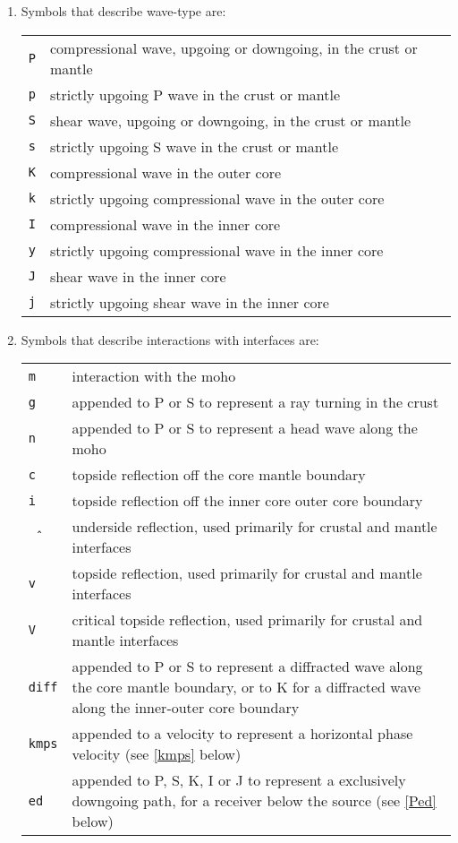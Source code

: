 \begin{enumerate}
\item Symbols that describe wave-type are:

\begin{tabular}{lp{5.0in}}
\texttt{P} & compressional wave, upgoing or downgoing, in the crust or mantle \\
\texttt{p} & strictly upgoing P wave in the crust or mantle \\
\texttt{S} & shear wave, upgoing or downgoing, in the crust or mantle \\
\texttt{s} & strictly upgoing S wave in the crust or mantle \\
\texttt{K} & compressional wave in the outer core \\
\texttt{k} & strictly upgoing compressional wave in the outer core \\
\texttt{I} & compressional wave in the inner core \\
\texttt{y} & strictly upgoing compressional wave in the inner core \\
\texttt{J} & shear wave in the inner core \\
\texttt{j} & strictly upgoing shear wave in the inner core \\
\end{tabular}

\item Symbols that describe interactions with interfaces are:

\begin{tabular}{lp{5.0in}}
\texttt{m} & interaction with the moho \\
\texttt{g} & appended to P or S to represent a ray turning in the crust \\
\texttt{n} & appended to P or S to represent a head wave along the moho \\
\texttt{c} & topside reflection off the core mantle boundary \\
\texttt{i} & topside reflection off the inner core outer core boundary \\
\texttt{\^\,} & underside reflection, used primarily for crustal and mantle interfaces \\
\texttt{v} & topside reflection, used primarily for crustal and mantle interfaces \\
\texttt{V} & critical topside reflection, used primarily for crustal and mantle interfaces \\
\texttt{diff} & appended to P or S to represent a diffracted wave along the core mantle boundary, or to K for a diffracted wave along the inner-outer core boundary \\
\texttt{kmps} & appended to a velocity to represent a horizontal phase velocity (see
\ref{kmps} below)\\
\texttt{ed} & appended to P, S, K, I or J to represent a exclusively downgoing path, for a receiver below the source (see
\ref{Ped} below)\\
\end{tabular}


\end{enumerate}
